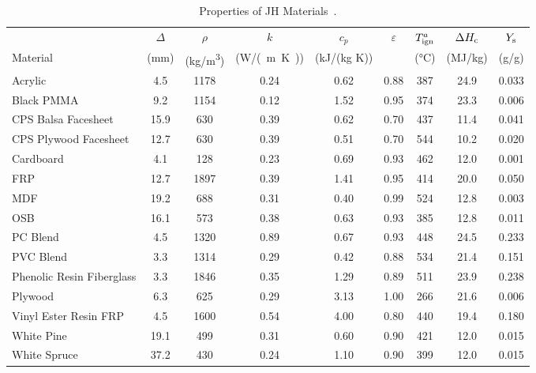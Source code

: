 \begin{table}[!h]
\caption[Properties of JH Materials]{Properties of JH Materials~\cite{Luo:FRA2019,Lattimer:NIJ19}.}
\centering
\begin{tabular}{|l|c|c|c|c|c|c|c|c|}
\hline
            & $\Delta$  & $\rho$       & $k$        & $c_{p}$     & $\varepsilon$ & $T_{\rm{ign}}^{a}$ & $\Delta H_{\rm c}$ & $Y_{\rm s}$ \\
Material    & (mm)      & (\unit{kg/m^3})   & (\unit{W/(m.K)})  & (kJ/(kg K)) &               & (\unit{\degreeCelsius})        & (MJ/kg)            & (g/g)       \\ \hline
\hline
Acrylic                                           & 4.5  & 1178 & 0.24 & 0.62 & 0.88 & 387 & 24.9 & 0.033 \\\hline
Black PMMA                                        & 9.2  & 1154 & 0.12 & 1.52 & 0.95 & 374 & 23.3 & 0.006 \\\hline
CPS Balsa Facesheet                               & 15.9 & 630  & 0.39 & 0.62 & 0.70 & 437 & 11.4 & 0.041 \\\hline
CPS Plywood Facesheet                             & 12.7 & 630  & 0.39 & 0.51 & 0.70 & 544 & 10.2 & 0.020 \\\hline
Cardboard                                         & 4.1  & 128  & 0.23 & 0.69 & 0.93 & 462 & 12.0 & 0.001 \\\hline
FRP                                               & 12.7 & 1897 & 0.39 & 1.41 & 0.95 & 414 & 20.0 & 0.050 \\\hline
MDF                                               & 19.2 & 688  & 0.31 & 0.40 & 0.99 & 524 & 12.8 & 0.003 \\\hline
OSB                                               & 16.1 & 573  & 0.38 & 0.63 & 0.93 & 385 & 12.8 & 0.011 \\\hline
PC Blend                                          & 4.5  & 1320 & 0.89 & 0.67 & 0.93 & 448 & 24.5 & 0.233 \\\hline
PVC Blend                                         & 3.3  & 1314 & 0.29 & 0.42 & 0.88 & 534 & 21.4 & 0.151 \\\hline
Phenolic Resin Fiberglass                         & 3.3  & 1846 & 0.35 & 1.29 & 0.89 & 511 & 23.9 & 0.238 \\\hline
Plywood                                           & 6.3  & 625  & 0.29 & 3.13 & 1.00 & 266 & 21.6 & 0.006 \\\hline
Vinyl Ester Resin FRP                             & 4.5  & 1600 & 0.54 & 4.00 & 0.80 & 440 & 19.4 & 0.180 \\\hline
White Pine                                        & 19.1 & 499  & 0.31 & 0.60 & 0.90 & 421 & 12.0 & 0.015 \\\hline
White Spruce                                      & 37.2 & 430  & 0.24 & 1.10 & 0.90 & 399 & 12.0 & 0.015 \\\hline
\end{tabular}
\label{Properties_JH_Materials_All}
\end{table}
\vspace{-0.4cm}
\\


